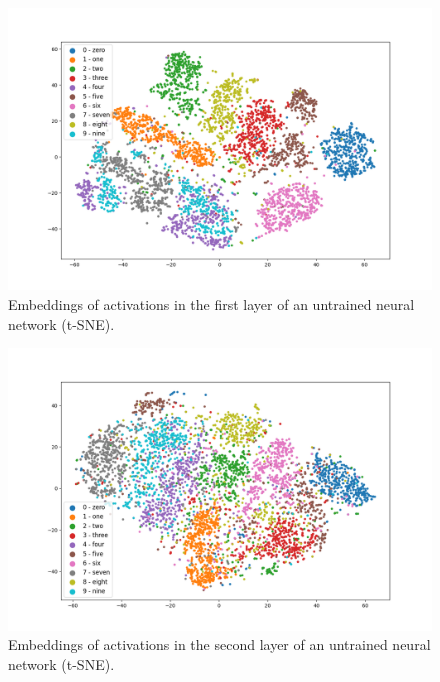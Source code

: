 \documentclass{article}
\begin{document}
\begin{figure}
  \centering
    \includegraphics[width=1.0\textwidth]{../../out/activations_cnn/mnist/t-sne/untrained/plot_l1_f0.png}
    \caption{Embeddings of activations in the first layer of an untrained neural network (t-SNE).}
\end{figure}

\begin{figure}
  \centering
    \includegraphics[width=1.0\textwidth]{../../out/activations_cnn/mnist/t-sne/untrained/plot_l2_f0.png}
    \caption{Embeddings of activations in the second layer of an untrained neural network (t-SNE).}
\end{figure}
\end{document}
